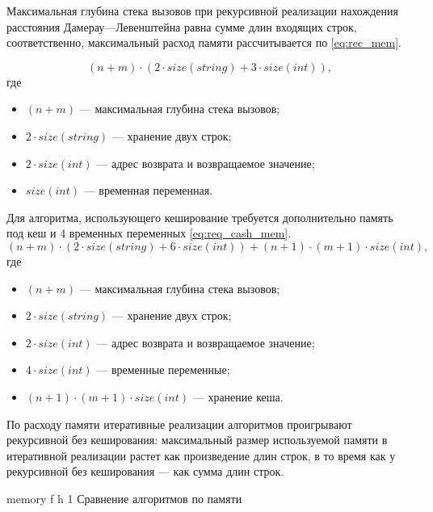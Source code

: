 Максимальная глубина стека вызовов при рекурсивной реализации нахождения расстояния Дамерау---Левенштейна равна сумме длин входящих строк, соответственно, максимальный расход памяти рассчитывается по \eqref{eq:rec_mem}.

\begin{equation}
	\label{eq:rec_mem}
	(n + m) \cdot (2 \cdot size(string) + 3 \cdot size(int)),
\end{equation}
где 
\begin{itemize}
	\item $ (n + m) $ --- максимальная глубина стека вызовов;
	\item $ 2 \cdot size(string) $ --- хранение двух строк;
	\item $ 2 \cdot size(int) $ --- адрес возврата и возвращаемое значение;
	\item $ size(int) $ --- временная переменная.
\end{itemize}

Для алгоритма, использующего кеширование требуется дополнительно память под кеш и 4 временных переменных \eqref{eq:req_cash_mem}.
\begin{equation}
	\label{eq:req_cash_mem}
	(n + m) \cdot (2 \cdot size(string) + 6 \cdot size(int)) + (n + 1) \cdot (m + 1) \cdot size(int),
\end{equation}
где 
\begin{itemize}
	\item $ (n + m) $ --- максимальная глубина стека вызовов;
	\item $ 2 \cdot size(string) $ --- хранение двух строк;
	\item $ 2 \cdot size(int) $ --- адрес возврата и возвращаемое значение;
	\item $ 4 \cdot size(int) $ --- временные переменные;
	\item $ (n + 1) \cdot (m + 1) \cdot size(int) $ --- хранение кеша.
\end{itemize}

По расходу памяти итеративные реализации алгоритмов проигрывают рекурсивной без кеширования: максимальный размер используемой памяти в итеративной реализации растет как произведение длин строк, в то время как у рекурсивной без кеширования --- как сумма длин строк.

{memory} %
{f} %
{h} %
{1\textwidth} %
{Сравнение алгоритмов по памяти} %

